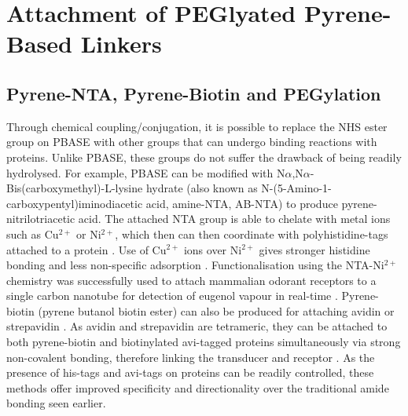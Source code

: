 \documentclass[
  a4paper,
]{scrbook}
\begin{document}
\hypertarget{sec-NTA-biotin-PEG}{%
\section{Attachment of PEGlyated Pyrene-Based
Linkers}\label{sec-NTA-biotin-PEG}}

\hypertarget{pyrene-nta-pyrene-biotin-and-pegylation}{%
\subsection{Pyrene-NTA, Pyrene-Biotin and
PEGylation}\label{pyrene-nta-pyrene-biotin-and-pegylation}}

Through chemical coupling/conjugation, it is possible to replace the NHS
ester group on PBASE with other groups that can undergo binding
reactions with proteins. Unlike PBASE, these groups do not suffer the
drawback of being readily hydrolysed. For example, PBASE can be modified
with N\(\alpha\),N\(\alpha\)-Bis(carboxymethyl)-L-lysine hydrate (also
known as N-(5-Amino-1-carboxypentyl)iminodiacetic acid, amine-NTA,
AB-NTA) to produce pyrene-nitrilotriacetic acid. The attached NTA group
is able to chelate with metal ions such as Cu\(^{2+}\) or Ni\(^{2+}\),
which then can then coordinate with polyhistidine-tags attached to a
protein \autocite{Holzinger2011,Fruh2011,Amano2016,Chang2017}. Use of
Cu\(^{2+}\) ions over Ni\(^{2+}\) gives stronger histidine bonding and
less non-specific adsorption \autocite{Chang2017}. Functionalisation
using the NTA-Ni\(^{2+}\) chemistry was successfully used to attach
mammalian odorant receptors to a single carbon nanotube for detection of
eugenol vapour in real-time \autocite{Goldsmith2011}. Pyrene-biotin
(pyrene butanol biotin ester) can also be produced for attaching avidin
or strepavidin \autocite{Holzinger2011}. As avidin and strepavidin are
tetrameric, they can be attached to both pyrene-biotin and biotinylated
avi-tagged proteins simultaneously via strong non-covalent bonding,
therefore linking the transducer and receptor
\autocite{Star2003a,Dundas2013,Hermanson2013-11,Fairhead2015}. As the
presence of his-tags and avi-tags on proteins can be readily controlled,
these methods offer improved specificity and directionality over the
traditional amide bonding seen earlier.
\end{document}
